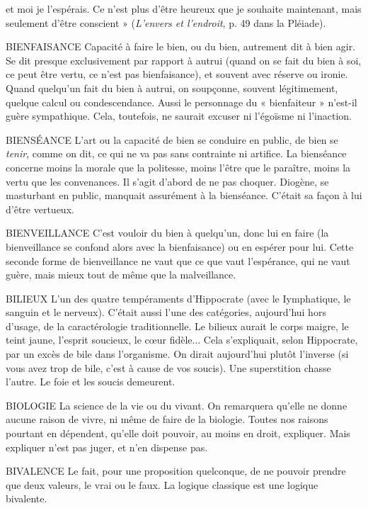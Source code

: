 et moi je l’espérais. Ce n’est plus d’être heureux que je souhaite maintenant,
mais seulement d’être conscient » ({\it L'envers et l'endroit}, p. 49 dans la Pléiade).

BIENFAISANCE Capacité à faire le bien, ou du bien, autrement dit à bien
agir. Se dit presque exclusivement par rapport à autrui
(quand on se fait du bien à soi, ce peut être vertu, ce n’est pas bienfaisance), et
souvent avec réserve ou ironie. Quand quelqu'un fait du bien à autrui, on
soupçonne, souvent légitimement, quelque calcul ou condescendance. Aussi le
personnage du « bienfaiteur » n’est-il guère sympathique. Cela, toutefois, ne
saurait excuser ni l’égoïsme ni l’inaction.

BIENSÉANCE  L’art ou la capacité de bien se conduire en public, de bien se
{\it tenir}, comme on dit, ce qui ne va pas sans contrainte ni artifice.
La bienséance concerne moins la morale que la politesse, moins l’être que
le paraître, moins la vertu que les convenances. Il s’agit d’abord de ne pas choquer.
Diogène, se masturbant en public, manquait assurément à la bienséance.
C'était sa façon à lui d’être vertueux.

BIENVEILLANCE C'est vouloir du bien à quelqu'un, donc lui en faire (la
bienveillance se confond alors avec la bienfaisance) ou en
espérer pour lui. Cette seconde forme de bienveillance ne vaut que ce que vaut
l'espérance, qui ne vaut guère, mais mieux tout de même que la malveillance.

BILIEUX L'un des quatre tempéraments d’Hippocrate (avec le Iymphatique,
le sanguin et le nerveux). C'était aussi l’une des catégories,
aujourd’hui hors d’usage, de la caractérologie traditionnelle. Le bilieux aurait le
corps maigre, le teint jaune, l'esprit soucieux, le cœur fidèle... Cela s’expliquait,
selon Hippocrate, par un excès de bile dans l'organisme. On dirait
aujourd’hui plutôt l'inverse (si vous avez trop de bile, c’est à cause de vos
soucis). Une superstition chasse l’autre. Le foie et les soucis demeurent.

BIOLOGIE La science de la vie ou du vivant. On remarquera qu’elle ne
donne aucune raison de vivre, ni même de faire de la biologie.
Toutes nos raisons pourtant en dépendent, qu’elle doit pouvoir, au moins en
droit, expliquer. Mais expliquer n’est pas juger, et n’en dispense pas.

BIVALENCE Le fait, pour une proposition quelconque, de ne pouvoir
prendre que deux valeurs, le vrai ou le faux. La logique classique
est une logique bivalente.

